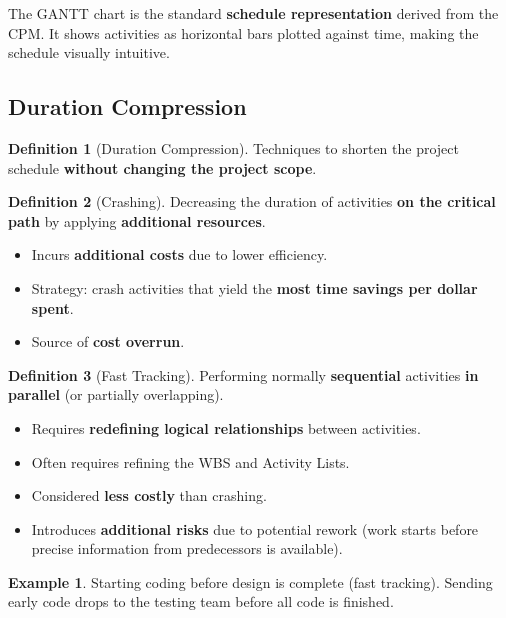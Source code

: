 \documentclass[11pt,a4paper]{article}
\theoremstyle{definition}
\newtheorem{definition}{Definition}[section]
\newtheorem{example}{Example}[section]
\theoremstyle{plain}
\begin{document}
\begin{remark}
The GANTT chart is the standard \textbf{schedule representation} derived from the CPM. It shows activities as horizontal bars plotted against time, making the schedule visually intuitive.
\end{remark}

\subsection{Duration Compression}

\begin{definition}[Duration Compression]
Techniques to shorten the project schedule \textbf{without changing the project scope}.
\end{definition}

\begin{definition}[Crashing]
Decreasing the duration of activities \textbf{on the critical path} by applying \textbf{additional resources}.
\begin{itemize}[nosep]
  \item Incurs \textbf{additional costs} due to lower efficiency.
  \item Strategy: crash activities that yield the \textbf{most time savings per dollar spent}.
  \item Source of \textbf{cost overrun}.
\end{itemize}
\end{definition}

\begin{definition}[Fast Tracking]
Performing normally \textbf{sequential} activities \textbf{in parallel} (or partially overlapping).
\begin{itemize}[nosep]
  \item Requires \textbf{redefining logical relationships} between activities.
  \item Often requires refining the WBS and Activity Lists.
  \item Considered \textbf{less costly} than crashing.
  \item Introduces \textbf{additional risks} due to potential rework (work starts before precise information from predecessors is available).
\end{itemize}
\end{definition}

\begin{example}
Starting coding before design is complete (fast tracking). Sending early code drops to the testing team before all code is finished.
\end{example}
\end{document}
